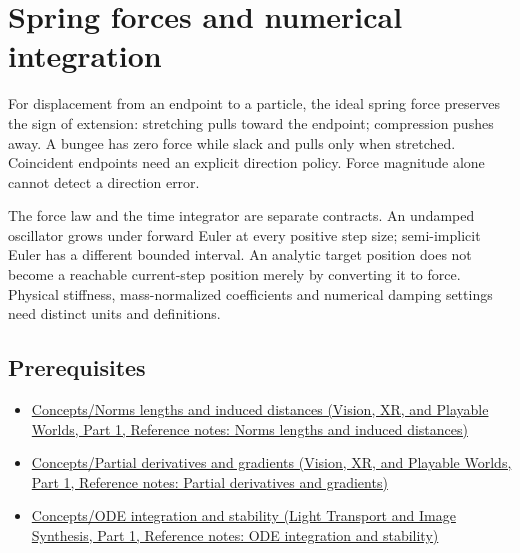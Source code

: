 \hypertarget{appendix-e040e2108923}{}\label{referencestart:appendix-e040e2108923}
\section{Spring forces and numerical integration}\label{appendix-e040e2108923-spring-forces-and-numerical-integration}

\hypertarget{appendix-e040e2108923-spring-forces-and-numerical-integration}{}

For displacement from an endpoint to a particle, the ideal spring force preserves the sign of extension: stretching pulls toward the endpoint; compression pushes away. A bungee has zero force while slack and pulls only when stretched. Coincident endpoints need an explicit direction policy. Force magnitude alone cannot detect a direction error.

The force law and the time integrator are separate contracts. An undamped oscillator grows under forward Euler at every positive step size; semi-implicit Euler has a different bounded interval. An analytic target position does not become a reachable current-step position merely by converting it to force. Physical stiffness, mass-normalized coefficients and numerical damping settings need distinct units and definitions.

\subsection{Prerequisites}\label{appendix-e040e2108923-prerequisites}

\hypertarget{appendix-e040e2108923-prerequisites}{}

\begin{itemize}
\tightlist
\item
  \href{../07-Vision-XR-and-Playable-Worlds-P01/main.pdf\#nameddest=appendix-49933872bb51}{Concepts/Norms lengths and induced distances (Vision, XR, and Playable Worlds, Part 1, Reference notes: Norms lengths and induced distances)}
\item
  \href{../07-Vision-XR-and-Playable-Worlds-P01/main.pdf\#nameddest=appendix-677b59746ae0}{Concepts/Partial derivatives and gradients (Vision, XR, and Playable Worlds, Part 1, Reference notes: Partial derivatives and gradients)}
\item
  \href{../04-Light-Transport-and-Image-Synthesis-P01/main.pdf\#nameddest=appendix-18eacf61a04b}{Concepts/ODE integration and stability (Light Transport and Image Synthesis, Part 1, Reference notes: ODE integration and stability)}
\end{itemize}

